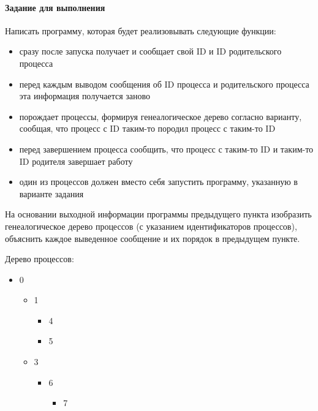 \paragraph{Задание для выполнения}
Написать программу, которая будет реализовывать следующие функции:
\begin{itemize}
    \item сразу после запуска получает и сообщает свой ID и ID родительского процесса
    \item перед каждым выводом сообщения об ID процесса и родительского процесса эта информация получается заново
    \item порождает процессы, формируя генеалогическое дерево согласно варианту, сообщая, что процесс с ID таким-то породил процесс с таким-то ID
    \item перед завершением процесса сообщить, что процесс с таким-то ID и таким-то ID родителя завершает работу
    \item один из процессов должен вместо себя запустить программу, указанную в варианте задания
\end{itemize}
На основании выходной информации программы предыдущего пункта изобразить генеалогическое дерево процессов (с указанием идентификаторов процессов), объяснить каждое выведенное сообщение и их порядок в предыдущем пункте.




Дерево процессов:
\begin{itemize}
    \item 0
    \begin{itemize}
        \item 1
        \begin{itemize}
            \item 4
            \item 5
        \end{itemize}
        \item 3
        \begin{itemize}
            \item 6
            \begin{itemize}
                \item 7
            \end{itemize}
        \end{itemize}
    \end{itemize}
\end{itemize}